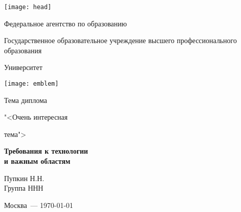 \begin{titlepage}

	\centering
	\texttt{[image: head]}
	\centerline{\hfill\hrulefill\hrulefill\hfill}
	\centerline{Федеральное агентство по образованию}
	\centerline{Государственное образовательное учреждение высшего профессионального образования}
	\centerline{Университет}

	\centering
	\texttt{[image: emblem]}

	\vfill
	\large
	\centerline{Тема диплома}
	\centerline{"<Очень интересная}
	\centerline{тема">}
		
	\normalsize
	\vfill
	
	\begin{LARGE}
        \begin{centering}
            {\bf Требования к технологии\\ и важным областям\\}
        \end{centering}
    \end{LARGE}
	
	\vfill

	\begin{flushright}
		Пупкин Н.Н.\\
		Группа ННН\\
	\end{flushright}

	\vfill
	\centerline{Москва~--- \today}

\end{titlepage}

\setcounter{page}{2}

\clearpage
